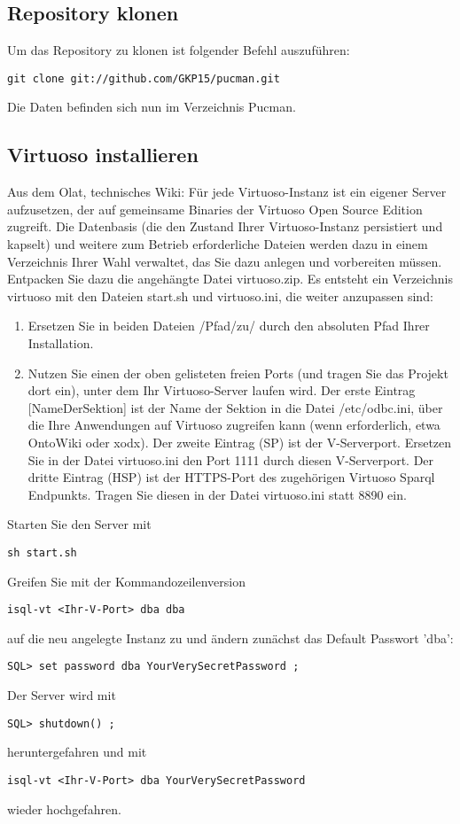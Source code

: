 \documentclass[11pt,a4paper]{article}
\begin{document}
\subsection{Repository klonen}
Um das Repository zu klonen ist folgender Befehl auszuführen:
\begin{lstlisting}
git clone git://github.com/GKP15/pucman.git
\end{lstlisting}
Die Daten befinden sich nun im Verzeichnis Pucman.
\subsection{Virtuoso installieren}
Aus dem Olat, technisches Wiki:
Für jede Virtuoso-Instanz ist ein eigener Server aufzusetzen, der auf gemeinsame Binaries der Virtuoso Open Source Edition zugreift. Die Datenbasis (die den Zustand Ihrer Virtuoso-Instanz persistiert und kapselt) und weitere zum Betrieb erforderliche Dateien werden dazu in einem Verzeichnis Ihrer Wahl verwaltet, das Sie dazu anlegen und vorbereiten müssen.
Entpacken Sie dazu die angehängte Datei virtuoso.zip. Es entsteht ein Verzeichnis virtuoso mit den Dateien start.sh und virtuoso.ini, die weiter anzupassen sind:

\begin{enumerate}
	\item Ersetzen Sie in beiden Dateien /Pfad/zu/ durch den absoluten Pfad Ihrer Installation.
	\item Nutzen Sie einen der oben gelisteten freien Ports (und tragen Sie das Projekt dort ein), unter dem Ihr Virtuoso-Server laufen wird. Der erste Eintrag [NameDerSektion] ist der Name der Sektion in die Datei /etc/odbc.ini, über die Ihre Anwendungen auf Virtuoso zugreifen kann (wenn erforderlich, etwa OntoWiki oder xodx). Der zweite Eintrag (SP) ist der V-Serverport. Ersetzen Sie in der Datei virtuoso.ini den Port 1111 durch diesen V-Serverport. Der dritte Eintrag (HSP) ist der HTTPS-Port des zugehörigen Virtuoso Sparql Endpunkts. Tragen Sie diesen in der Datei virtuoso.ini statt 8890 ein.
\end{enumerate}
Starten Sie den Server mit
\begin{lstlisting}
sh start.sh
\end{lstlisting}
Greifen Sie mit der Kommandozeilenversion
\begin{lstlisting}
isql-vt <Ihr-V-Port> dba dba
\end{lstlisting}
auf die neu angelegte Instanz zu und ändern zunächst das Default Passwort 'dba':
\begin{lstlisting}
SQL> set password dba YourVerySecretPassword ;
\end{lstlisting}
Der Server wird mit
\begin{lstlisting}
SQL> shutdown() ;
\end{lstlisting}
heruntergefahren und mit
\begin{lstlisting}
isql-vt <Ihr-V-Port> dba YourVerySecretPassword
\end{lstlisting}
wieder hochgefahren.
\end{document}
